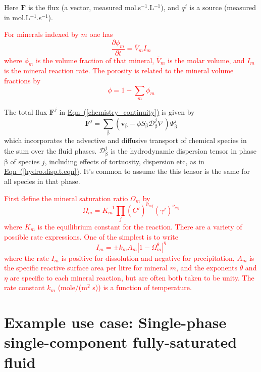 \documentclass[12pt]{report}
\def\phase{\mathrm{\beta}}
\def\flux{\mathbf{F}}
\def\darcyvel{\mathbf{v}}
\begin{document}
Here $\flux$ is the flux (a vector, measured
mol.s$^{-1}$.L$^{-1}$), and $q^{j}$ is a source (measured in
mol.L$^{-1}$.s$^{-1}$).

\textcolor{red}{
For minerals indexed by $m$ one has
\begin{equation}
  \frac{\partial \phi_{m}}{\partial t} = \overline{V}_{m} I_{m}
\end{equation}
where $\phi_{m}$ is the volume fraction of that mineral,
$\overline{V}_{m}$ is the molar volume, and $I_{m}$ is the mineral
reaction rate. The porosity is related to the mineral volume fractions
by
\begin{equation}
  \phi=1-\sum_{m} \phi_{m}
\end{equation}
}

The total flux $\flux^{j}$ in
\hyperref[chemistry_continuity]{Eqn~(\ref*{chemistry_continuity})} is
given by
\begin{equation}
  \flux^{j}=\sum_{\phase} (\darcyvel_{\phase} - \phi S_{\phase} {\mathcal{D}}_{\phase}^{j} \nabla) \Psi_{\phase}^{j}
\end{equation}
which incorporates the advective and diffusive transport of chemical
species in the sum over the fluid phases. ${\mathcal{D}}_{\phase}^{j}$
is the hydrodynamic dispersion tensor in phase $\phase$ of species
$j$, including effects of tortuosity, dispersion etc, as in
\hyperref[hydro.disp.t.eqn]{Eqn~(\ref*{hydro.disp.t.eqn})}. It's
common to assume the this tensor is the same for all species in that
phase.

\textcolor{red}{
First define the mineral saturation ratio $\Omega_{m}$ by
\begin{equation}
  \Omega_{m}=K_{m}^{-1} \prod_{j} (C^{j})^{\nu_{mj}} (\gamma^{j})^{\nu_{mj}}
\end{equation}
where $K_{m}$ is the equilibrium constant for the reaction. There are
a variety of possible rate expressions. One of the simplest is to
write
\begin{equation}
  I_{m} = \pm k_{m} A_{m} |1-\Omega_{m}^{\theta}|^{\eta}
\end{equation}
where the rate $I_{m}$ is positive for dissolution and negative for
precipitation, $A_{m}$ is the specific reactive surface area per litre
for mineral $m$, and the exponents $\theta$ and $\eta$ are specific to
each mineral reaction, but are often both taken to be unity. The rate
constant $k_{m}$ (mole/(m$^{2}$ s)) is a function of temperature.  }

\section{Example use case: Single-phase single-component fully-saturated fluid}
\end{document}
